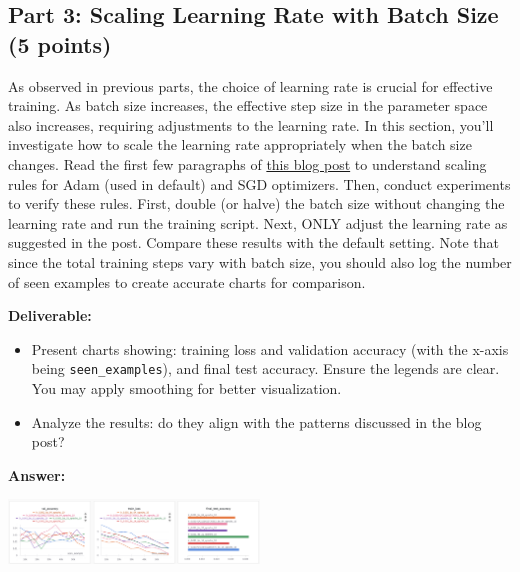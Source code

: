 \documentclass[11pt, oneside]{article}   	%
\begin{document}
\subsection*{Part 3: Scaling Learning Rate with Batch Size (5 points)}

As observed in previous parts, the choice of learning rate is crucial for effective training. As batch size increases, the effective step size in the parameter space also increases, requiring adjustments to the learning rate. In this section, you'll investigate how to scale the learning rate appropriately when the batch size changes. Read the first few paragraphs of \href{https://www.cs.princeton.edu/~smalladi/blog/2024/01/22/SDEs-ScalingRules/}{this blog post} to understand scaling rules for Adam (used in default) and SGD optimizers. Then, conduct experiments to verify these rules. First, double (or halve) the batch size without changing the learning rate and run the training script. Next, ONLY adjust the learning rate as suggested in the post. Compare these results with the default setting. Note that since the total training steps vary with batch size, you should also log the number of seen examples to create accurate charts for comparison.

\noindent\textbf{Deliverable:}
\begin{itemize}
    \item Present charts showing: training loss and validation accuracy (with the x-axis being \texttt{seen\_examples}), and final test accuracy. Ensure the legends are clear. You may apply smoothing for better visualization. 
    \item Analyze the results: do they align with the patterns discussed in the blog post?
\end{itemize}

\textbf{Answer:} \\
\begin{center}
    \includegraphics[width=0.5\textwidth]{p3p1_pic/ScaleLearningWBatchSizeChart1.png}
\end{center}
\end{document}
